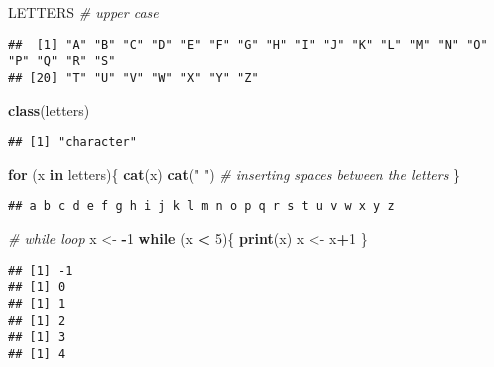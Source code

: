 \documentclass[
]{article}
\newenvironment{Shaded}{\begin{snugshade}}{\end{snugshade}}
\newcommand{\CommentTok}[1]{\textcolor[rgb]{0.56,0.35,0.01}{\textit{#1}}}
\newcommand{\ControlFlowTok}[1]{\textcolor[rgb]{0.13,0.29,0.53}{\textbf{#1}}}
\newcommand{\DecValTok}[1]{\textcolor[rgb]{0.00,0.00,0.81}{#1}}
\newcommand{\FunctionTok}[1]{\textcolor[rgb]{0.13,0.29,0.53}{\textbf{#1}}}
\newcommand{\NormalTok}[1]{#1}
\newcommand{\OtherTok}[1]{\textcolor[rgb]{0.56,0.35,0.01}{#1}}
\newcommand{\SpecialCharTok}[1]{\textcolor[rgb]{0.81,0.36,0.00}{\textbf{#1}}}
\newcommand{\StringTok}[1]{\textcolor[rgb]{0.31,0.60,0.02}{#1}}
\begin{document}
\begin{Shaded}
\begin{Highlighting}[]
\NormalTok{LETTERS }\CommentTok{\# upper case}
\end{Highlighting}
\end{Shaded}

\begin{verbatim}
##  [1] "A" "B" "C" "D" "E" "F" "G" "H" "I" "J" "K" "L" "M" "N" "O" "P" "Q" "R" "S"
## [20] "T" "U" "V" "W" "X" "Y" "Z"
\end{verbatim}

\begin{Shaded}
\begin{Highlighting}[]
\FunctionTok{class}\NormalTok{(letters)}
\end{Highlighting}
\end{Shaded}

\begin{verbatim}
## [1] "character"
\end{verbatim}

\begin{Shaded}
\begin{Highlighting}[]
\ControlFlowTok{for}\NormalTok{ (x }\ControlFlowTok{in}\NormalTok{ letters)\{}
\FunctionTok{cat}\NormalTok{(x)}
\FunctionTok{cat}\NormalTok{(}\StringTok{" "}\NormalTok{) }\CommentTok{\# inserting spaces between the letters}
\NormalTok{\}}
\end{Highlighting}
\end{Shaded}

\begin{verbatim}
## a b c d e f g h i j k l m n o p q r s t u v w x y z
\end{verbatim}

\begin{Shaded}
\begin{Highlighting}[]
\CommentTok{\# while loop}
\NormalTok{x }\OtherTok{\textless{}{-}} \SpecialCharTok{{-}}\DecValTok{1}
\ControlFlowTok{while}\NormalTok{ (x }\SpecialCharTok{\textless{}} \DecValTok{5}\NormalTok{)\{}
\FunctionTok{print}\NormalTok{(x)}
\NormalTok{x }\OtherTok{\textless{}{-}}\NormalTok{ x}\SpecialCharTok{+}\DecValTok{1}
\NormalTok{\}}
\end{Highlighting}
\end{Shaded}

\begin{verbatim}
## [1] -1
## [1] 0
## [1] 1
## [1] 2
## [1] 3
## [1] 4
\end{verbatim}
\end{document}
